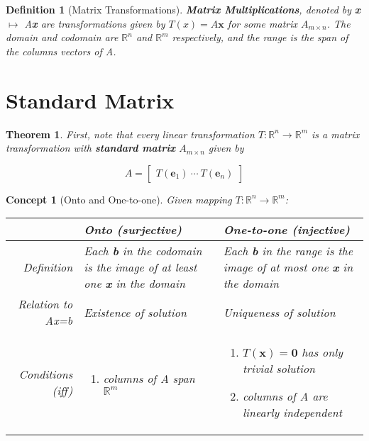 \documentclass[12pt]{report}
\newtheorem{thm}{Theorem}
\newtheorem{dfn}{Definition}
\newtheorem{cpt}{Concept}
\begin{document}
\begin{dfn}[Matrix Transformations]

\textbf{Matrix Multiplications}, denoted by \textbf{x} $\mapsto$ A\textbf{x} are transformations given by $T(x)=A\bm{x}$ for some matrix $A_{m\times n}$. The domain and codomain are $\mathbb{R}^n$ and $\mathbb{R}^m$ respectively, and the range is the span of the columns vectors of A.

\end{dfn}

\section{Standard Matrix}

\begin{thm}
First, note that every linear transformation $T:\mathbb{R}^n\to \mathbb{R}^m$ is a matrix transformation with \textbf{standard matrix} $A_{m\times n}$ given by

\begin{equation}
A=
\begin{bmatrix}
T(\bm{e}_1) \: \cdots \: T(\bm{e}_n)
\end{bmatrix}
\end{equation}

\end{thm}

\begin{cpt}[Onto and One-to-one]

Given mapping $T:\mathbb{R}^n\to \mathbb{R}^m$:

\begin{center}
\begin{tabular}{r|p{5cm}|p{5cm}}

& Onto (surjective) & One-to-one (injective) \\ \hline
Definition & Each \textbf{b} in the codomain is the image of at least one \textbf{x} in the domain & Each \textbf{b} in the range is the image of at most one \textbf{x} in the domain \\ \hline
Relation to Ax=b & Existence of solution  & Uniqueness of solution \\ \hline
Conditions (iff) & 
\begin{enumerate}
\item columns of A span $\mathbb{R}^m$ 
\end{enumerate}
&
\begin{enumerate}
\item $T(\bm{x})=\bm{0}$ has only trivial solution
\item columns of A are linearly independent 
\end{enumerate}
\\ \hline

\end{tabular}
\end{center}
\end{cpt}
\end{document}
